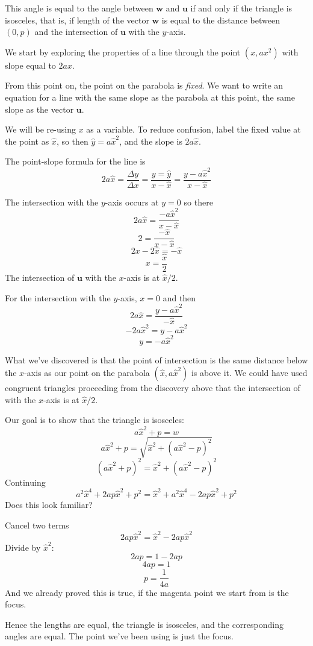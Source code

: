 \documentclass[11pt, oneside]{article}
\begin{document}
This angle is equal to the angle between $\mathbf{w}$ and $\mathbf{u}$ if and only if the triangle is isosceles, that is, if length of the vector $\mathbf{w}$ is equal to the distance between $(0,p)$ and the intersection of $\mathbf{u}$ with the $y$-axis.  

We start by exploring the properties of a line through the point $(x, ax^2)$ with slope equal to $2ax$.  

From this point on, the point on the parabola is \emph{fixed}.  We want to write an equation for a line with the same slope as the parabola at this point, the same slope as the vector $\mathbf{u}$.

We will be re-using $x$ as a variable.  To reduce confusion, label the fixed value at the point as $\hat{x}$, so then $\hat{y} = a\hat{x}^2$, and the slope is $2a \hat{x}$.

The point-slope formula for the line is 
\[ 2a \hat{x} = \frac{\Delta y}{\Delta x} = \frac{y = \hat{y}}{x - \hat{x}} =  \frac{y - a \hat{x}^2}{x - \hat{x}} \]

The intersection with the $y$-axis occurs at $y = 0$ so there
\[ 2a \hat{x} = \frac{- a \hat{x}^2}{x - \hat{x}} \]
\[ 2 = \frac{- \hat{x}}{x - \hat{x}} \]
\[ 2x - 2 \hat{x} = - \hat{x} \]
\[ x = \frac{\hat{x}}{2} \]
The intersection of $\mathbf{u}$ with the $x$-axis is at $\hat{x}/2$.

For the intersection with the $y$-axis, $x = 0$ and then
\[ 2a \hat{x} = \frac{y - a \hat{x}^2}{- \hat{x}} \]
\[ -2a \hat{x}^2 = y - a \hat{x}^2 \]
\[ y = - a \hat{x}^2 \]

What we've discovered is that the point of intersection is the same distance below the $x$-axis as our point on the parabola $(\hat{x}, a\hat{x}^2)$ is above it.  We could have used congruent triangles proceeding from the discovery above that the intersection of with the $x$-axis is at $\hat{x}/2$.

Our goal is to show that the triangle is isosceles:
\[ a\hat{x}^2 + p = w \]
\[ a\hat{x}^2 + p = \sqrt{\hat{x}^2 + (a\hat{x}^2 - p)^2} \]
\[ (a\hat{x}^2 + p)^2 = \hat{x}^2 + (a\hat{x}^2 - p)^2 \]
Continuing
\[ a^2 \hat{x}^4 + 2ap \hat{x}^2 + p^2 = \hat{x}^2 + a^2 \hat{x}^4 - 2ap \hat{x}^2 + p^2 \]
Does this look familiar?

Cancel two terms
\[ 2ap \hat{x}^2 = \hat{x}^2  - 2ap \hat{x}^2 \]
Divide by $\hat{x}^2$:
\[ 2ap = 1 - 2ap \]
\[ 4ap = 1 \]
\[ p = \frac{1}{4a} \]
And we already proved this is true, if the magenta point we start from is the focus.

Hence the lengths are equal, the triangle is isosceles, and the corresponding angles are equal.  The point we've been using is just the focus.
\end{document}

